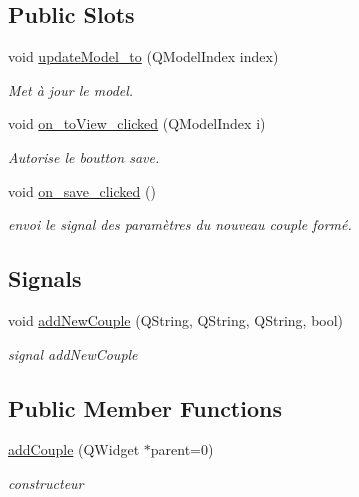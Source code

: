 \subsection*{Public Slots}
\begin{DoxyCompactItemize}
\item 
void \hyperlink{classadd_couple_aa0334cda3e89d32093da234cbd1e8c07}{update\+Model\+\_\+to} (Q\+Model\+Index index)
\begin{DoxyCompactList}\small\item\em Met à jour le model. \end{DoxyCompactList}\item 
void \hyperlink{classadd_couple_af8d724cab931e45a5e68a341fd831aca}{on\+\_\+to\+View\+\_\+clicked} (Q\+Model\+Index i)
\begin{DoxyCompactList}\small\item\em Autorise le boutton save. \end{DoxyCompactList}\item 
\mbox{\label{classadd_couple_ad3a6409a37b17097325d0b65ee1ab15b}} 
void \hyperlink{classadd_couple_ad3a6409a37b17097325d0b65ee1ab15b}{on\+\_\+save\+\_\+clicked} ()
\begin{DoxyCompactList}\small\item\em envoi le signal des paramètres du nouveau couple formé. \end{DoxyCompactList}\end{DoxyCompactItemize}
\subsection*{Signals}
\begin{DoxyCompactItemize}
\item 
\mbox{\label{classadd_couple_a2c807c5516dfa2ff6ecd00622914eb4c}} 
void \hyperlink{classadd_couple_a2c807c5516dfa2ff6ecd00622914eb4c}{add\+New\+Couple} (Q\+String, Q\+String, Q\+String, bool)
\begin{DoxyCompactList}\small\item\em signal add\+New\+Couple \end{DoxyCompactList}\end{DoxyCompactItemize}
\subsection*{Public Member Functions}
\begin{DoxyCompactItemize}
\item 
\hyperlink{classadd_couple_a5c478c6e07cd0b9639c4c84687c89764}{add\+Couple} (Q\+Widget $\ast$parent=0)
\begin{DoxyCompactList}\small\item\em constructeur \end{DoxyCompactList}\end{DoxyCompactItemize}


